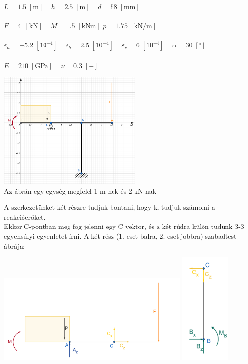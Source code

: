 \documentclass[10pt, a4paper]{article}
\newcommand{\adat}{\begin{trivlist}\item[\hskip \labelsep {\bfseries 
			{Adatok:}}]\end{trivlist}}
\newcommand{\egy}{\begin{trivlist}\item[\hskip \labelsep {\bfseries 
			{1. Feladat:}}]\end{trivlist}}
\newcommand{\knm}{\;\mathrm{\left[kNm\right]}}
\newcommand{\kn}{\;\mathrm{\left[kN\right]}}
\newcommand{\meter}{\mathrm{\left[m\right]}}
\newcommand{\pknm}{\mathrm{\left[kN/m\right]}}
\newcommand{\mm}{\mathrm{\left[mm\right]}}
\newcommand{\minegy}{\mathrm{\left[10^{-4}\right]}}
\newcommand{\dimnel}{\mathrm{\left[-\right]}}
\newcommand{\fok}{\mathrm{\left[^\circ\right]}}
\newcommand{\gpa}{\mathrm{\left[GPa\right]}}
\begin{document}
	
	\adat
	$ L = 1.5\;\meter \;\;\;$ $ h = 2.5\;\meter \;\;\;$ $ d = 58\;\mm$\\\\
	$ F = 4\;\kn \;\;\; $ $ M = 1.5\knm $ $ p = 1.75\;\pknm \;\;\;$\\\\
	$ \varepsilon_a = -5.2\;\minegy \;\;\;$ $ \varepsilon_b = 2.5\;\minegy \;\;\;$ $ \varepsilon_c = 6\;\minegy \;\;\;$ $ \alpha = 30\;\fok \;\;\;$\\\\
	$ E = 210\;\gpa \;\;\;$ $ \nu = 0.3\;\dimnel \;\;\;$
	\setcounter{page}{1}
	\egy
	\begin{center}
		\includegraphics[width=200pt]{ meretarany.png }\\
		Az ábrán egy egység megfelel 1 m-nek és 2 kN-nak
	\end{center}
	A szerkezetünket két részre tudjuk bontani, hogy ki tudjuk számolni a reakcióerőket.\\
	Ekkor C-pontban meg fog jelenni egy C vektor, és a két rúdra külön tudunk 3-3 egyensúlyi-egyenletet írni.
	A két rész (1. eset balra, 2. eset jobbra) szabadtest-ábrája:
	\begin{center}
		\includegraphics[width=270pt]{ SZTA1.png }
		\includegraphics[width=70pt]{ SZTA2.png }
	\end{center}
\end{document}
